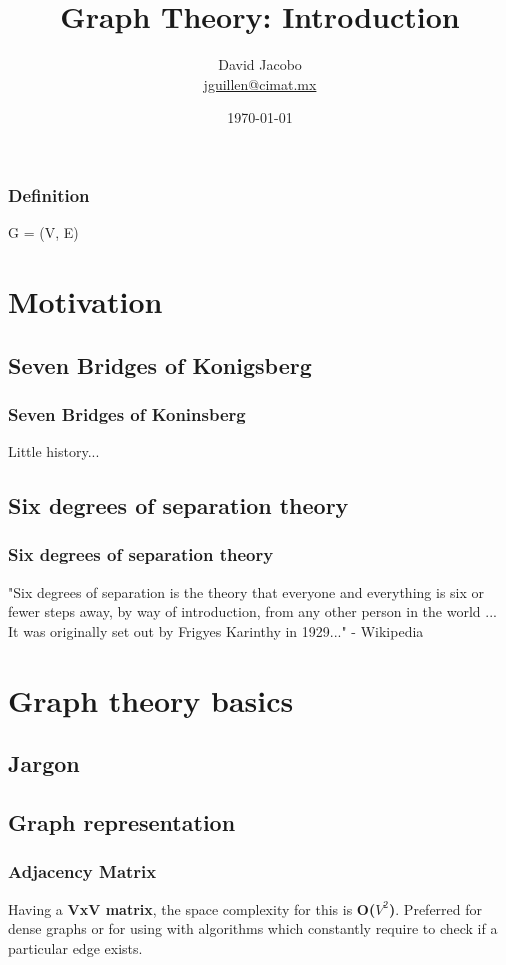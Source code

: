 \documentclass[article]{beamer}
\title{Graph Theory: Introduction}
\author{David Jacobo \\ \href{mailto:jguillen@cimat.mx}{jguillen@cimat.mx}}
\date{\scriptsize{\today}}
\begin{document}
\maketitle
			
\begin{frame}
\frametitle{Definition}
\begin{center}
\huge
	G = (V, E)
\end{center}
\end{frame}


\section{Motivation}

\subsection{Seven Bridges of Konigsberg}
\begin{frame}
	\frametitle{Seven Bridges of Koninsberg}
	Little history...
	
\end{frame}

\subsection{Six degrees of separation theory}
\begin{frame}
	\frametitle{Six degrees of separation theory}
	"Six degrees of separation is the theory that everyone and everything is six or fewer steps away, by way of introduction, from any other person in the world ... It was originally set out by Frigyes Karinthy in 1929..." - Wikipedia
\end{frame}

\section{Graph theory basics}

\subsection{Jargon}
\begin{frame}
\end{frame}

\subsection{Graph representation}
\begin{frame}
	\frametitle{Adjacency Matrix}
	Having a \textbf{VxV matrix}, the space complexity for this is \textbf{O($V^2$)}. Preferred for dense graphs or for using with algorithms which constantly require to check if a particular edge exists.
\end{frame}
\end{document}
